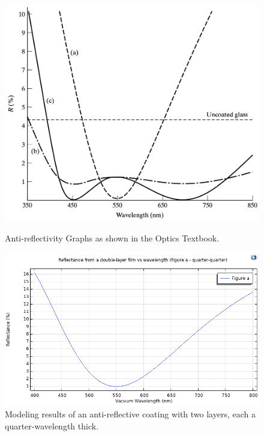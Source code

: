 \begin{figure}[H]
  \centering
  \begin{minipage}{0.45\textwidth}
    \centering
    \includegraphics[width=\textwidth]{Chapters/Figures/Chapter 4 Figures/Antireflectivity Graphs in the Optics Book.png}
    \caption{Anti-reflectivity Graphs as shown in the Optics Textbook.}
    \label{fig:antireflectivity graphs in the Optics book}
  \end{minipage}\hfill
  \begin{minipage}{0.45\textwidth}
    \centering
    \includegraphics[width=\textwidth]{Chapters/Figures/Chapter 4 Figures/Anti-Reflectance Figure a.png}
    \caption{Modeling results of an anti-reflective coating with two layers, each a quarter-wavelength thick.}

\end{minipage}
\end{figure}
